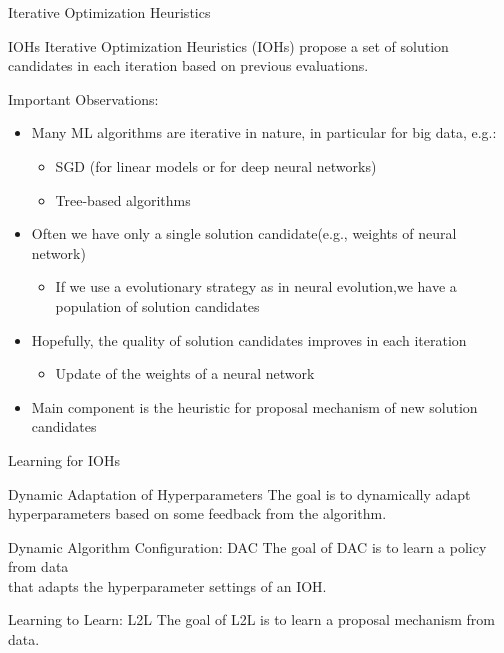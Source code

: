 \begin{frame}[c]{Iterative Optimization Heuristics}

\begin{block}{IOHs}
	Iterative Optimization Heuristics (IOHs) propose a set of solution candidates in each iteration
	based on previous evaluations.
\end{block}

\pause
\smallskip
Important Observations:
\begin{itemize}
	\item Many ML algorithms are  \alert{iterative} in nature, in particular for big data, e.g.:
	\begin{itemize}
		\item SGD (for linear models or for deep neural networks)
		\item Tree-based algorithms
	\end{itemize}
	\pause
	\smallskip
	\item Often we have only a \alert{single solution candidate}\newline (e.g., weights of neural network)
	\begin{itemize}
		\item If we use a evolutionary strategy as in neural evolution,\newline we have a population of solution candidates
	\end{itemize}
	\pause
	\smallskip
	\item Hopefully, the \alert{quality} of solution candidates \alert{improves} in each iteration
	\begin{itemize}
		\item Update of the weights of a neural network
	\end{itemize}
	\pause
	\smallskip
	\item Main component is the \alert{heuristic for proposal mechanism} of new solution candidates
\end{itemize}

\end{frame}
\begin{frame}[c]{Learning for IOHs}

\begin{block}{Dynamic Adaptation of Hyperparameters}
	The goal is to dynamically adapt hyperparameters based on some feedback from the algorithm.
\end{block}

\bigskip
\pause	

\begin{block}{Dynamic Algorithm Configuration: DAC}
	The goal of DAC is to learn a policy from data\\ that adapts the \alert{hyperparameter settings} of an IOH.
\end{block}

\bigskip
\pause

\begin{block}{Learning to Learn: L2L}
	The goal of L2L is to learn a \alert{proposal mechanism} from data.
\end{block}
	
\end{frame}
